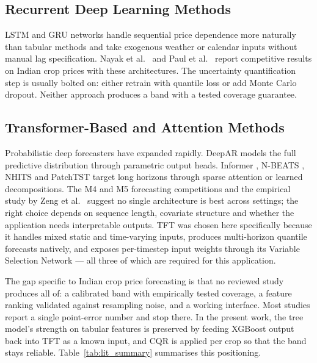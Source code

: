 \documentclass[conference,twoside]{IEEEtran}
\begin{document}
\subsection{Recurrent Deep Learning Methods}
LSTM and GRU networks handle sequential price dependence more naturally than tabular methods and take exogenous weather or calendar inputs without manual lag specification. Nayak et al.\ \cite{nayak2024top} and Paul et al.\ \cite{paul2022brinjal} report competitive results on Indian crop prices with these architectures. The uncertainty quantification step is usually bolted on: either retrain with quantile loss or add Monte Carlo dropout. Neither approach produces a band with a tested coverage guarantee.

\subsection{Transformer-Based and Attention Methods}
Probabilistic deep forecasters have expanded rapidly. DeepAR \cite{salinas2020deepar} models the full predictive distribution through parametric output heads. Informer \cite{zhou2021informer}, N-BEATS \cite{oreshkin2020nbeats}, NHITS \cite{challu2023nhits} and PatchTST \cite{nie2023patchtst} target long horizons through sparse attention or learned decompositions. The M4 and M5 forecasting competitions \cite{makridakis2018m4, makridakis2022m5accuracy, makridakis2022m5uncertainty} and the empirical study by Zeng et al.\ \cite{zeng2023transformers} suggest no single architecture is best across settings; the right choice depends on sequence length, covariate structure and whether the application needs interpretable outputs. TFT \cite{lim2021tft} was chosen here specifically because it handles mixed static and time-varying inputs, produces multi-horizon quantile forecasts natively, and exposes per-timestep input weights through its Variable Selection Network --- all three of which are required for this application.

The gap specific to Indian crop price forecasting is that no reviewed study produces all of: a calibrated band with empirically tested coverage, a feature ranking validated against resampling noise, and a working interface. Most studies report a single point-error number and stop there. In the present work, the tree model's strength on tabular features is preserved by feeding XGBoost output back into TFT as a known input, and CQR is applied per crop so that the band stays reliable. Table~\ref{tab:lit_summary} summarises this positioning.
\end{document}
